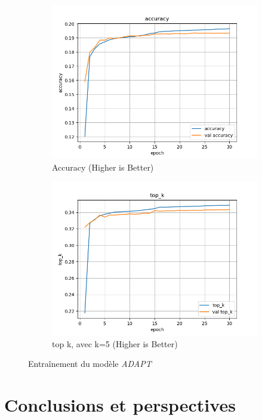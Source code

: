 \documentclass[a4paper]{article}
\begin{document}
\begin{figure}[ht]
  \begin{subfigure}{0.47\textwidth}
    \includegraphics[width=\linewidth]{../logs/learnfromword2vect_0/accuracy.png}
    \caption{Accuracy (Higher is Better)}
  \end{subfigure}
  \hfill
  \begin{subfigure}{0.47\textwidth}
    \includegraphics[width=\linewidth]{../logs/learnfromword2vect_0/top_k.png}
    \caption{top k, avec k=5 (Higher is Better)}
  \end{subfigure}
  \caption{Entraînement du modèle \textit{ADAPT}}
  \label{subfig:result model 3}
\end{figure}


\section{Conclusions et perspectives}
\end{document}

